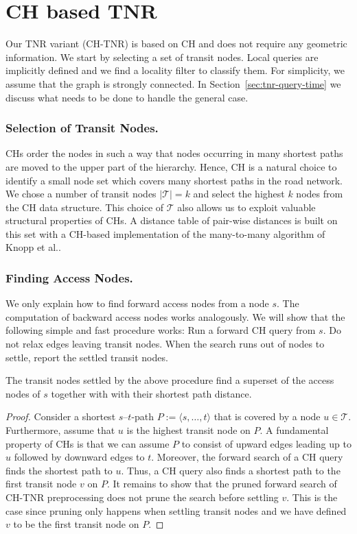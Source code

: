 \documentclass{llncs}
\newcommand{\etal}{et al.\xspace}
\begin{document}
\section{CH based TNR}\label{sec:tnr-our-variant}
Our TNR variant  (CH-TNR) is based on CH and does not require any geometric information. We start by selecting a set of transit nodes. 
Local queries are implicitly defined and we find a locality filter to classify them. For simplicity, we assume that the graph is strongly connected. In Section~\ref{sec:tnr-query-time} we discuss what needs to be done to handle the general case.

\subsubsection{Selection of Transit Nodes.}
CHs order the  nodes in such a way that nodes occurring in many shortest paths are moved to the upper part of the hierarchy.
Hence, CH is a natural choice to identify a small node set which covers many shortest paths in the road network.
We chose a number of transit nodes $\vert\mathcal{T}\vert=k$ and select the highest $k$ nodes from the CH data structure.
This choice of $\mathcal{T}$ also allows us to exploit valuable structural properties of CHs. 
A distance table of pair-wise distances is built on this set with a CH-based implementation of the many-to-many algorithm of Knopp \etal \cite{ksssw-cmmsp-07}. 

\subsubsection{Finding Access Nodes.}
We only explain how to find forward access nodes from a node $s$. The computation of backward access nodes works analogously. We will show that the following simple and fast procedure works: Run a forward CH query from $s$. Do not relax edges leaving transit nodes. When the search runs out of nodes to settle, report the settled transit nodes. 

\begin{lemma}\label{lem:findAccess}
The transit nodes settled by the above procedure find a superset of the access nodes of $s$ together with  with their shortest path distance.
\begin{proof}


Consider a shortest $s$--$t$-path $P:=\langle s,\ldots, t\rangle$ that is covered by a node $u\in\mathcal{T}$.
Furthermore, assume that $u$ is the highest transit node on $P$. 
A fundamental property of CHs is that we can assume $P$ to consist of upward edges leading up to $u$ followed by downward edges to $t$. 
Moreover, the forward search of a CH query finds the shortest path to $u$. 
Thus, a CH query also finds a shortest path to the first transit node $v$ on $P$. 
It remains to show that the pruned forward search of CH-TNR preprocessing does not prune the search before settling $v$. 
This is the case since pruning only happens when settling transit nodes and we have defined $v$ to be the first transit node on $P$. 




\end{proof}
\end{lemma}
\end{document}
